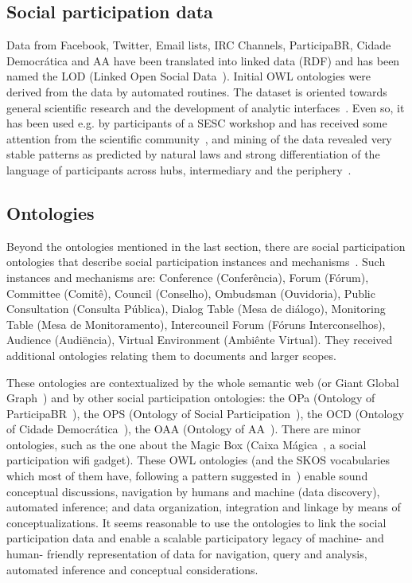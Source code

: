 \documentclass[letterpaper,10pt]{article}
\begin{document}
\subsection{Social participation data}\label{losd}
Data from Facebook, Twitter, Email lists, IRC Channels, ParticipaBR,
Cidade Democrática and AA have been translated into linked data (RDF)
and has been named the LOD (Linked Open Social Data~\cite{losd}).
Initial OWL ontologies were derived from the data by automated routines.
The dataset is oriented towards general scientific research
and the development of analytic interfaces~\cite{p1,p2,p3,p4,p5}.
Even so, it has been used e.g. by participants of a SESC workshop
and has received some attention from the scientific community~\cite{mariliaNexos,tese},
and mining of the data revealed very stable patterns as predicted by natural laws
and strong differentiation of the language of participants across hubs,
intermediary and the periphery~\cite{stab,tese}. 

\subsection{Ontologies}\label{ont}
Beyond the ontologies mentioned in the last section,
there are social participation ontologies that describe
social participation instances and mechanisms~\cite{p5}.
Such instances and mechanisms are:
Conference (Conferência), Forum (Fórum),
Committee (Comitê), Council (Conselho), Ombudsman (Ouvidoria),
Public Consultation (Consulta Pública), Dialog Table (Mesa de diálogo),
Monitoring Table (Mesa de Monitoramento), Intercouncil Forum (Fóruns Interconselhos),
Audience (Audiëncia),
Virtual Environment (Ambiênte Virtual).
They received additional ontologies relating them to documents and
larger scopes.

These ontologies are contextualized by the whole semantic web
(or Giant Global Graph~\cite{losd})
and by other social participation ontologies:
the OPa (Ontology of ParticipaBR~\cite{p5}), the OPS (Ontology of Social Participation~\cite{ops}),
the OCD (Ontology of Cidade Democrática~\cite{p5}), the OAA (Ontology of AA~\cite{p5}).
There are minor ontologies, such as the one about the Magic Box (Caixa Mágica~\cite{cm},
a social participation wifi gadget).
These OWL ontologies (and the SKOS vocabularies which most of them have, following
a pattern suggested in~\cite{ont}) enable
sound conceptual discussions, navigation by humans and machine (data discovery),
 automated inference; and data organization, integration and linkage by means of conceptualizations.
It seems reasonable to use the ontologies to link the social participation data
and enable a scalable participatory legacy of machine- and human- friendly representation
of data for navigation, query and analysis, automated inference
and conceptual considerations.
\end{document}
